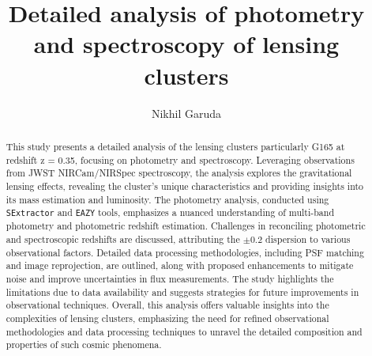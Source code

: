 \documentclass[twocolumn,linenumbers]{aastex631}
\begin{document}
\title{Detailed analysis of photometry and spectroscopy of lensing clusters}

\author[0000-0003-3418-2482]{Nikhil Garuda}



\begin{abstract}

This study presents a detailed analysis of the lensing clusters particularly G165 at redshift z = 0.35, focusing on photometry and spectroscopy. Leveraging observations from JWST NIRCam/NIRSpec spectroscopy, the analysis explores the gravitational lensing effects, revealing the cluster's unique characteristics and providing insights into its mass estimation and luminosity. The photometry analysis, conducted using \texttt{SExtractor} and \texttt{EAZY} tools, emphasizes a nuanced understanding of multi-band photometry and photometric redshift estimation. Challenges in reconciling photometric and spectroscopic redshifts are discussed, attributing the $\pm0.2$ dispersion to various observational factors. Detailed data processing methodologies, including PSF matching and image reprojection, are outlined, along with proposed enhancements to mitigate noise and improve uncertainties in flux measurements. The study highlights the limitations due to data availability and suggests strategies for future improvements in observational techniques. Overall, this analysis offers valuable insights into the complexities of lensing clusters, emphasizing the need for refined observational methodologies and data processing techniques to unravel the detailed composition and properties of such cosmic phenomena.

\end{abstract}
\end{document}
